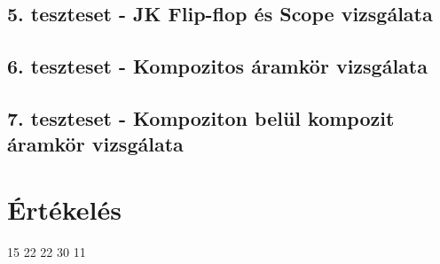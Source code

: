 \subsection{5. teszteset - JK Flip-flop és Scope vizsgálata}

\subsection{6. teszteset - Kompozitos áramkör vizsgálata}

\subsection{7. teszteset - Kompoziton belül kompozit áramkör vizsgálata}












\section{Értékelés}

\begin{ertekeles}
{15}        %
{22}
{22}
{30}
{11}
\end{ertekeles}

